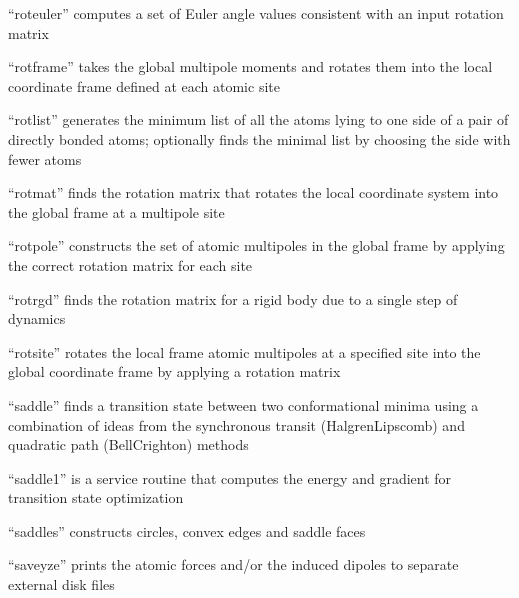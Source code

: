 \documentclass[letterpaper,11pt,english]{sphinxmanual}
\begin{document}

“roteuler” computes a set of Euler angle values consistent
with an input rotation matrix


“rotframe” takes the global multipole moments and rotates them
into the local coordinate frame defined at each atomic site


“rotlist” generates the minimum list of all the atoms lying
to one side of a pair of directly bonded atoms; optionally
finds the minimal list by choosing the side with fewer atoms


“rotmat” finds the rotation matrix that rotates the local
coordinate system into the global frame at a multipole site


“rotpole” constructs the set of atomic multipoles in the global
frame by applying the correct rotation matrix for each site


“rotrgd” finds the rotation matrix for a rigid body due
to a single step of dynamics


“rotsite” rotates the local frame atomic multipoles at a
specified site into the global coordinate frame by applying
a rotation matrix


“saddle” finds a transition state between two conformational
minima using a combination of ideas from the synchronous transit
(Halgren\sphinxhyphen{}Lipscomb) and quadratic path (Bell\sphinxhyphen{}Crighton) methods


“saddle1” is a service routine that computes the energy and
gradient for transition state optimization


“saddles” constructs circles, convex edges and saddle faces


“saveyze” prints the atomic forces and/or the induced dipoles
to separate external disk files
\end{document}
